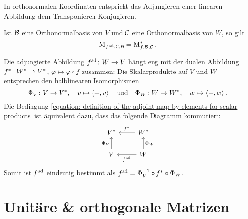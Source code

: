 In orthonormalen Koordinaten entspricht das Adjungieren einer linearen Abbildung dem Transponieren-Konjugieren.

\begin{lemma}
  Ist $\mathcal{B}$ eine Orthonormalbasis von $V$ und $\mathcal{C}$ eine Orthonormalbasis von $W$, so gilt
  \[
      \operatorname{M}_{f^{\operatorname{ad}}, \mathcal{C}, \mathcal{B}}
    = \operatorname{M}_{f, \mathcal{B}, \mathcal{C}} ^*.
  \]
\end{lemma}

Die adjungierte Abbildung $f^{\operatorname{ad}} \colon W \to V$ hängt eng mit der dualen Abbildung $f^* \colon W^* \to V^*$, $\varphi \mapsto \varphi \circ f$ zusammen:
Die Skalarprodukte auf $V$ und $W$ entsprechen den halblinearen Isomorphismen
\[
          \Phi_V
  \colon  V
  \to     V^*,
  \quad   v
  \mapsto \left\langle -, v \right\rangle
  \quad\text{und}\quad
  \Phi_W
  \colon  W
  \to     W^*,
  \quad   w
  \mapsto \left\langle -, w \right\rangle.
\]
Die Bedingung \eqref{equation: definition of the adjoint map by elements for scalar products} ist äquivalent dazu, dass das folgende Diagramm kommutiert:
\[
  \begin{tikzcd}
      V^*
    & W^*
      \arrow[swap]{l}{\dual{f}}
    \\
      V
      \arrow{u}{\Phi_V}
    & W
      \arrow[swap]{u}{\Phi_W}
      \arrow{l}{\adj{f}}
  \end{tikzcd}
\]
Somit ist $f^{\operatorname{ad}}$ eindeutig bestimmt als $f^{\operatorname{ad}} = \Phi_V^{-1} \circ f^* \circ \Phi_W$.



\section{Unitäre \& orthogonale Matrizen}

